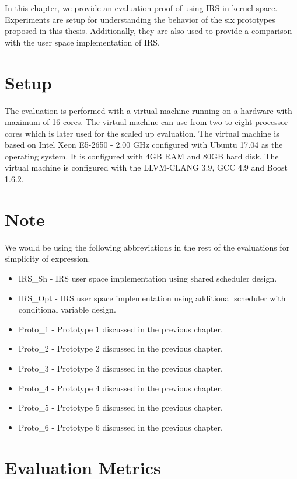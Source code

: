 In this chapter, we provide an evaluation proof of using IRS in kernel space. 
Experiments are setup for understanding the behavior of the six prototypes proposed in this thesis. 
Additionally, they are also used to provide a comparison with the user space implementation of IRS. 

\section{Setup}

The evaluation is performed with a virtual machine running on a hardware with maximum of 16 cores. 
The virtual machine can use from two to eight processor cores which is later used for the scaled up evaluation. 
The virtual machine is based on Intel Xeon E5-2650 - 2.00 GHz configured with Ubuntu 17.04 as the operating system. 
It is configured with 4GB RAM and 80GB hard disk. 
The virtual machine is configured with the LLVM-CLANG 3.9, GCC 4.9 and Boost 1.6.2.

\section*{Note}

We would be using the following abbreviations in the rest of the evaluations for simplicity of expression.
\begin{itemize}
\item {IRS\_Sh} - IRS user space implementation using shared scheduler design.
\item {IRS\_Opt} - IRS user space implementation using additional scheduler with conditional variable design.
\item {Proto\_1} - Prototype 1 discussed in the previous chapter.
\item {Proto\_2} - Prototype 2 discussed in the previous chapter.
\item {Proto\_3} - Prototype 3 discussed in the previous chapter.
\item {Proto\_4} - Prototype 4 discussed in the previous chapter.
\item {Proto\_5} - Prototype 5 discussed in the previous chapter.
\item {Proto\_6} - Prototype 6 discussed in the previous chapter.

\end{itemize}

\section{Evaluation Metrics}

